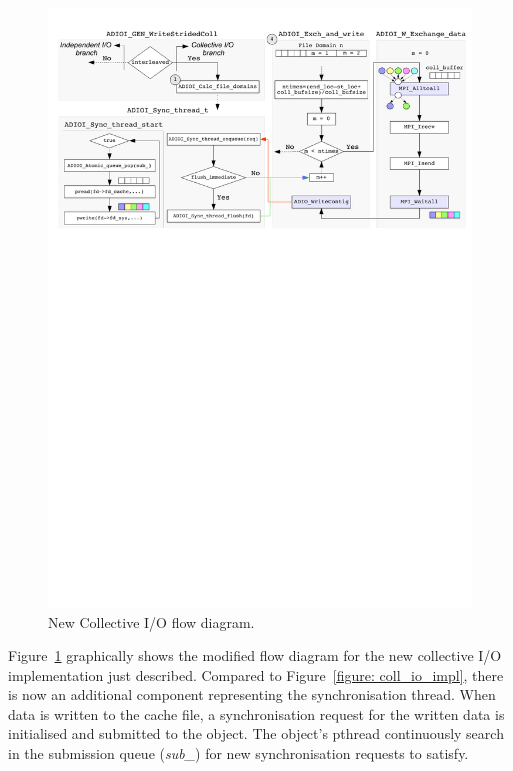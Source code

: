 \begin{figure}[!htb]
  \centering
  \includegraphics[width=\textwidth]{chapters/chapter3/figures/ext2ph+e10}
  \caption{New Collective I/O flow diagram.}
  \label{figure: new_coll_io_impl}
\end{figure}

Figure~\ref{figure: new_coll_io_impl} graphically shows the modified flow diagram for the new collective I/O implementation just described. Compared to Figure~\ref{figure: coll_io_impl}, there is now an additional component representing the synchronisation thread. When data is written to the cache file, a synchronisation request for the written data is initialised and submitted to the  object. The object's pthread continuously search in the submission queue (\textit{sub\_}) for new synchronisation requests to satisfy.


